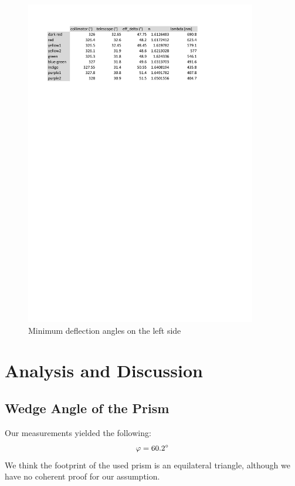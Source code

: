 \documentclass{scrreprt}
\renewcommand{\phi}{\varphi}
\begin{document}
\begin{figure}[H]
	\centering
  \includegraphics[width=0.9\textwidth]{diag/left.pdf}
	\caption{Minimum deflection angles on the left side}
	\label{fig:left}
\end{figure}

\section{Analysis and Discussion}

\subsection{Wedge Angle of the Prism}

Our measurements yielded the following:
\begin{equation}
	\phi = \ang{60.2}
\notag
\end{equation}
We think the footprint of the used prism is an equilateral triangle, although we have no coherent proof for our assumption.
\end{document}
